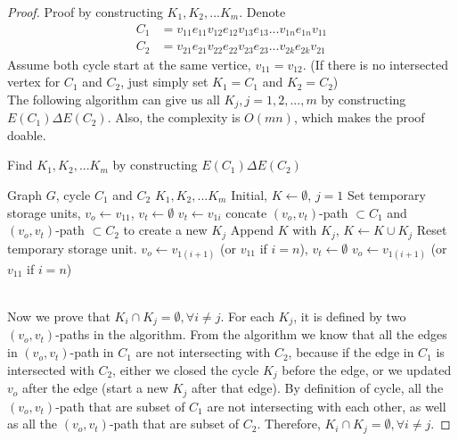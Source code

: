 			\begin{proof}
				Proof by constructing $K_1, K_2, ... K_m$. Denote 
				\begin{align}
					C_1 & = v_{11}e_{11}v_{12}e_{12}v_{13}e_{13}...v_{1n}e_{1n}v_{11}\\
					C_2 & = v_{21}e_{21}v_{22}e_{22}v_{23}e_{23}...v_{2k}e_{2k}v_{21}
				\end{align}
				Assume both cycle start at the same vertice, $v_{11} = v_{12}$. (If there is no intersected vertex for $C_1$ and $C_2$, just simply set $K_1 = C_1$ and $K_2 = C_2$)\\
				The following algorithm can give us all $K_j, j=1, 2, ... , m$ by constructing $E(C_1)\Delta E(C_2)$.  Also, the complexity is $O(mn)$, which makes the proof doable.\\
				\begin{algorithm}[!ht]
					\caption{Find $K_1, K_2, ... K_m$ by constructing $E(C_1)\Delta E(C_2)$}
					\begin{algorithmic}[1]
						\REQUIRE Graph $G$, cycle $C_1$ and $C_2$
						\ENSURE $K_1, K_2, ... K_m$
						\STATE Initial, $K \gets \emptyset$, $j = 1$
						\STATE Set temporary storage units, $v_o \gets v_{11}$, $v_t \gets \emptyset$
									\STATE $v_t \gets v_{1i}$
									\STATE concate $(v_o, v_t)$-path $\subset C_1$ and $(v_o, v_t)$-path $\subset C_2$ to create a new $K_j$
									\STATE Append $K$ with $K_j$, $K \gets K \cup K_j$
									\STATE Reset temporary storage unit. $v_o \gets v_{1(i+1)}$ (or $v_{11}$ if $i = n$), $v_t \gets \emptyset$
								\ELSE
									\STATE $v_o \gets v_{1(i+1)}$ (or $v_{11}$ if $i = n$)
								\ENDIF
							\ENDIF
						\ENDFOR
					\end{algorithmic}
				\end{algorithm}\\
				Now we prove that $K_i\cap K_j = \emptyset, \forall i \ne j$. For each $K_j$, it is defined by two $(v_o, v_t)$-paths in the algorithm. From the algorithm we know that all the edges in $(v_o, v_t)$-path in $C_1$ are not intersecting with $C_2$, because if the edge in $C_1$ is intersected with $C_2$, either we closed the cycle $K_j$ before the edge, or we updated $v_o$ after the edge (start a new $K_j$ after that edge). By definition of cycle, all the $(v_o, v_t)$-path that are subset of $C_1$ are not intersecting with each other, as well as all the $(v_o, v_t)$-path that are subset of $C_2$. Therefore, $K_i\cap K_j = \emptyset, \forall i \ne j$.
			\end{proof}
			
